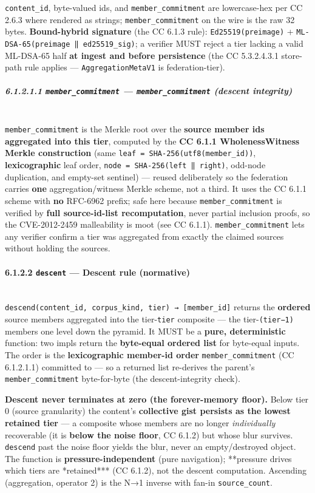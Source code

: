 \documentclass[11pt]{article}
\begin{document}
\texttt{content\_id}, byte-valued ids, and \texttt{member\_commitment} are lowercase-hex per CC 2.6.3 where rendered as strings; \texttt{member\_commitment} on the wire is the raw 32 bytes. \textbf{Bound-hybrid signature} (the CC 6.1.3 rule): \texttt{Ed25519(preimage)} + \texttt{ML-DSA-65(preimage ‖ ed25519\_sig)}; a verifier MUST reject a tier lacking a valid ML-DSA-65 half \textbf{at ingest and before persistence} (the CC 5.3.2.4.3.1 store-path rule applies — \texttt{AggregationMetaV1} is federation-tier).


\subparagraph{6.1.2.1.1 \texttt{member\_commitment} — \texttt{member\_commitment} (descent integrity)}\mbox{}\\


\texttt{member\_commitment} is the Merkle root over the \textbf{source member ids aggregated into this tier}, computed by the \textbf{CC 6.1.1 WholenessWitness Merkle construction} (same \texttt{leaf = SHA-256(utf8(member\_id))}, \textbf{lexicographic} leaf order, \texttt{node = SHA-256(left ‖ right)}, odd-node duplication, and empty-set sentinel) — reused deliberately so the federation carries \textbf{one} aggregation/witness Merkle scheme, not a third. It uses the CC 6.1.1 scheme with \textbf{no} RFC-6962 prefix; safe here because \texttt{member\_commitment} is verified by \textbf{full source-id-list recomputation}, never partial inclusion proofs, so the CVE-2012-2459 malleability is moot (see CC 6.1.1). \texttt{member\_commitment} lets any verifier confirm a tier was aggregated from exactly the claimed sources without holding the sources.


\paragraph{6.1.2.2 \texttt{descent} — Descent rule (normative)}\mbox{}\\


\texttt{descend(content\_id, corpus\_kind, tier) → [member\_id]} returns the \textbf{ordered} source members aggregated into the tier-\texttt{tier} composite — the tier-\texttt{(tier−1)} members one level down the pyramid. It MUST be a \textbf{pure, deterministic} function: two impls return the \textbf{byte-equal ordered list} for byte-equal inputs. The order is the \textbf{lexicographic member-id order} \texttt{member\_commitment} (CC 6.1.2.1.1) committed to — so a returned list re-derives the parent's \texttt{member\_commitment} byte-for-byte (the descent-integrity check).


\textbf{Descent never terminates at zero (the forever-memory floor).} Below tier 0 (source granularity) the content's \textbf{collective gist persists as the lowest retained tier} — a composite whose members are no longer \textit{individually} recoverable (it is \textbf{below the noise floor}, CC 6.1.2) but whose blur survives. \texttt{descend} past the noise floor yields the blur, never an empty/destroyed object. The function is \textbf{pressure-independent} (pure navigation); **pressure drives which tiers are *retained*** (CC 6.1.2), not the descent computation. Ascending (aggregation, operator 2) is the N→1 inverse with fan-in \texttt{source\_count}.
\end{document}
